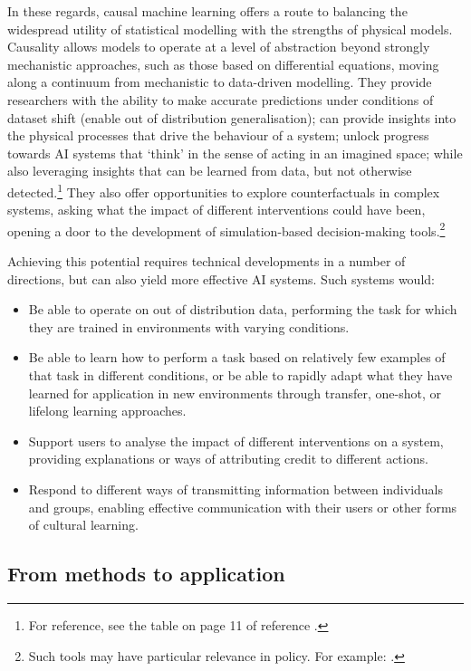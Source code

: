 In these regards, causal machine learning offers a route to balancing
the widespread utility of statistical modelling with the strengths of
physical models. Causality allows models to operate at a level of
abstraction beyond strongly mechanistic approaches, such as those based
on differential equations, moving along a continuum from mechanistic to
data-driven modelling. They provide researchers with the ability to make
accurate predictions under conditions of dataset shift (enable out of
distribution generalisation); can provide insights into the physical
processes that drive the behaviour of a system; unlock progress towards
AI systems that `think' in the sense of acting in an imagined space;
while also leveraging insights that can be learned from data, but not
otherwise detected.\footnote{For reference, see the table on page 11 of
  reference \citep{Scholkopf-causality22}.} They also offer opportunities to explore
counterfactuals in complex systems, asking what the impact of different
interventions could have been, opening a door to the development of
simulation-based decision-making tools.\footnote{Such tools may have
  particular relevance in policy. For example: \citep{Mastakouri-causal20}.}

Achieving this potential requires technical developments in a number of
directions, but can also yield more effective AI systems. Such systems
would:

\begin{itemize}
\item
  Be able to operate on out of distribution data, performing the task
  for which they are trained in environments with varying conditions.
\item
  Be able to learn how to perform a task based on relatively few
  examples of that task in different conditions, or be able to rapidly
  adapt what they have learned for application in new environments
  through transfer, one-shot, or lifelong learning approaches.
\item
  Support users to analyse the impact of different interventions on a
  system, providing explanations or ways of attributing credit to
  different actions.
\item
  Respond to different ways of transmitting information between
  individuals and groups, enabling effective communication with their
  users or other forms of cultural learning.
\end{itemize}

\subsection{From methods to
application}\label{from-methods-to-application}

